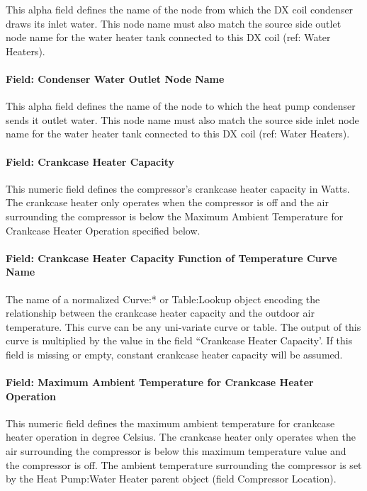 This alpha field defines the name of the node from which the DX coil condenser draws its inlet water. This node name must also match the source side outlet node name for the water heater tank connected to this DX coil (ref: Water Heaters).

\paragraph{Field: Condenser Water Outlet Node Name}\label{field-condenser-water-outlet-node-name}

This alpha field defines the name of the node to which the heat pump condenser sends it outlet water. This node name must also match the source side inlet node name for the water heater tank connected to this DX coil (ref: Water Heaters).

\paragraph{Field: Crankcase Heater Capacity}\label{field-crankcase-heater-capacity-7}

This numeric field defines the compressor's crankcase heater capacity in Watts. The crankcase heater only operates when the compressor is off and the air surrounding the compressor is below the Maximum Ambient Temperature for Crankcase Heater Operation specified below.

\paragraph{Field: Crankcase Heater Capacity Function of Temperature Curve Name}

The name of a normalized Curve:* or Table:Lookup object encoding the relationship between the crankcase heater capacity and the outdoor air temperature. This curve can be any uni-variate curve or table. The output of this curve is multiplied by the value in the field ``Crankcase Heater Capacity'. If this field is missing or empty, constant crankcase heater capacity will be
assumed.

\paragraph{Field: Maximum Ambient Temperature for Crankcase Heater Operation}\label{field-maximum-ambient-temperature-for-crankcase-heater-operation}

This numeric field defines the maximum ambient temperature for crankcase heater operation in degree Celsius. The crankcase heater only operates when the air surrounding the compressor is below this maximum temperature value and the compressor is off. The ambient temperature surrounding the compressor is set by the Heat Pump:Water Heater parent object (field Compressor Location).

